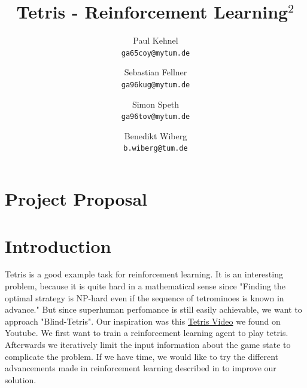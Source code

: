 \documentclass[10pt,twocolumn,letterpaper]{article}
\begin{document}
\title{Tetris - Reinforcement Learning$^2$}

\author{Paul Kehnel\\
{\tt\small ga65coy@mytum.de}
\and
Sebastian Fellner\\
{\tt\small ga96kug@mytum.de}
\and
Simon Speth\\
{\tt\small ga96tov@mytum.de}
\and
Benedikt Wiberg\\
{\tt\small b.wiberg@tum.de}
}


\maketitle

%
%
\section*{Project Proposal}

\section{Introduction}
   Tetris is a good example task for reinforcement learning.  It is an interesting problem, because it is quite hard in a mathematical sense since "Finding the optimal strategy is NP-hard even if the sequence of tetrominoes
    is known in advance."\cite{szita2006learning} 
 But since superhuman perfomance is still easily achievable, we want to approach "Blind-Tetris". Our inspiration was this \href{https://www.youtube.com/watch?v=8kqKOlcaZuI&t=5m10s}{Tetris Video} we found on Youtube. 
       We first want to train a reinforcement learning agent to play tetris. Afterwards we iteratively limit the input information about the game state to complicate the problem. If we have time, we would like to try the different advancements made in reinforcement learning described in \cite{hessel2017rainbow} to improve our solution.
           
\end{document}
